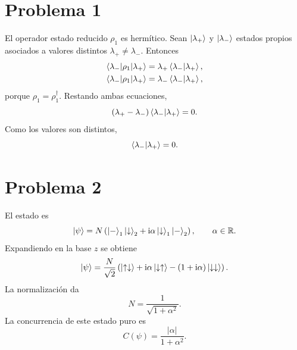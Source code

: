\documentclass[11pt,a4paper]{article}
\numberwithin{equation}{section}
\renewcommand{\boxed}[1]{#1}
\newcommand{\ii}{\mathrm i}
\newcommand{\R}{\mathbb R}
\begin{document}
\section{Problema 1}
El operador estado reducido $\rho_1$ es hermítico. Sean $\ket{\lambda_+}$ y $\ket{\lambda_-}$ estados propios asociados a valores distintos $\lambda_+\neq\lambda_-$. Entonces
\begin{align}
\braket{\lambda_-|\rho_1|\lambda_+}&=\lambda_+\braket{\lambda_-|\lambda_+},\\
\braket{\lambda_-|\rho_1|\lambda_+}&=\lambda_-\braket{\lambda_-|\lambda_+},
\end{align}
porque $\rho_1=\rho_1^\dagger$. Restando ambas ecuaciones,
\begin{equation}
(\lambda_+-\lambda_-)\braket{\lambda_-|\lambda_+}=0.
\end{equation}
Como los valores son distintos,
\begin{equation}
\boxed{\braket{\lambda_-|\lambda_+}=0.}
\end{equation}

\section{Problema 2}
El estado es
\begin{equation}
\ket\psi=N\left(\ket{-}_1\ket\downarrow_2+\ii\alpha\ket\downarrow_1\ket{-}_2\right),
\qquad \alpha\in\R.
\end{equation}
Expandiendo en la base $z$ se obtiene
\begin{equation}
\ket\psi=\frac{N}{\sqrt2}
\left(\ket{\uparrow\downarrow}+\ii\alpha\ket{\downarrow\uparrow}
-(1+\ii\alpha)\ket{\downarrow\downarrow}\right).
\end{equation}
La normalización da
\begin{equation}
\boxed{N=\frac1{\sqrt{1+\alpha^2}}.}
\end{equation}
La concurrencia de este estado puro es
\begin{equation}
\boxed{C(\psi)=\frac{|\alpha|}{1+\alpha^2}.}
\end{equation}
\end{document}

